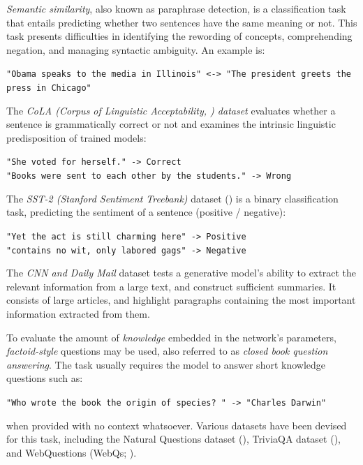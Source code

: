 \documentclass{article}
\begin{document}
\medskip
\noindent
\emph{Semantic similarity}, also known as paraphrase detection, is a classification task that entails predicting whether two sentences have the same meaning or not. This task presents difficulties in identifying the rewording of concepts, comprehending negation, and managing syntactic ambiguity. An example is:
\begin{center}
    \texttt{"Obama speaks to the media in Illinois" <-> "The president greets the press in Chicago"}
\end{center}

\medskip
\noindent
The \emph{CoLA (Corpus of Linguistic Acceptability, \citet{warstadt2019neural}) dataset} evaluates whether a sentence is grammatically correct or not and examines the intrinsic linguistic predisposition of trained models:
\begin{center}
    \texttt{"She voted for herself." -> Correct} \\
    \texttt{"Books were sent to each other by the students." -> Wrong}
\end{center}

\medskip
\noindent
The \emph{SST-2 (Stanford Sentiment Treebank)} dataset (\citet{socher2013sst}) is a binary classification task, predicting the sentiment of a sentence (positive / negative):
\begin{center}
    \texttt{"Yet the act is still charming here" -> Positive}\\
    \texttt{"contains no wit, only labored gags" -> Negative}
\end{center}

\medskip
\noindent
The \emph{CNN and Daily Mail} dataset tests a generative model's ability to extract the relevant information from a large text, and construct sufficient summaries. It consists of large articles, and highlight paragraphs containing the most important information extracted from them.

\medskip
\noindent
To evaluate the amount of \emph{knowledge} embedded in the network's parameters, \emph{factoid-style} questions may be used, also referred to as \emph{closed book question answering}. The task usually requires the model to answer short knowledge questions such as:
\begin{center}
    \texttt{"Who wrote the book the origin of species? " -> "Charles Darwin"}
\end{center}
when provided with no context whatsoever. Various datasets have been devised for this task, including the Natural Questions dataset (\citet{kwiatkowski2019nq}), TriviaQA dataset (\citet{joshi2017triviaqa}), and WebQuestions (WebQs; \citet{webqs}).
\end{document}
